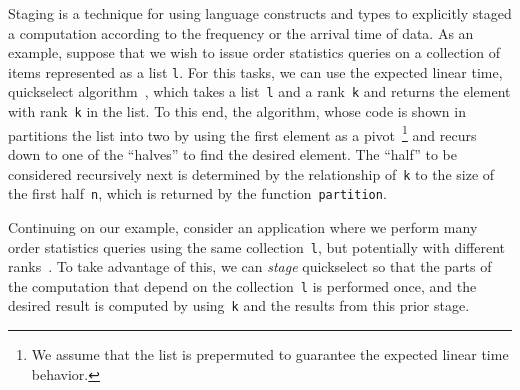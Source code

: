 Staging is a technique for using language constructs and types to
explicitly staged a computation according to the frequency or the
arrival time of data.  As an example, suppose that we wish to issue
order statistics queries on a collection of items represented as a
list \texttt{l}.  For this tasks, we can use the expected linear time,
quickselect algorithm~\cite{quickselect}, which takes a
list~\texttt{l} and a rank~\texttt{k} and returns the element with
rank~\texttt{k} in the list.  To this end, the algorithm, whose code
is shown in ~ partitions the list into two by
using the first element as a pivot~\footnote{We assume that the list
  is prepermuted to guarantee the expected linear time behavior.} and
recurs down to one of the ``halves'' to find the desired element.  The
``half'' to be considered recursively next is determined by the
relationship of~\texttt{k} to the size of the first half~\texttt{n},
which is returned by the function~\texttt{partition}.

Continuing on our example, consider an application where we perform
many order statistics queries using the same collection~\texttt{l}, but
potentially with different ranks~\cite{k}.  To take advantage of this,
we can {\em stage} quickselect so that the parts of the computation
that depend on the collection~\texttt{l} is performed once, and the
desired result is computed by using~\texttt{k} and the results from
this prior stage. 

